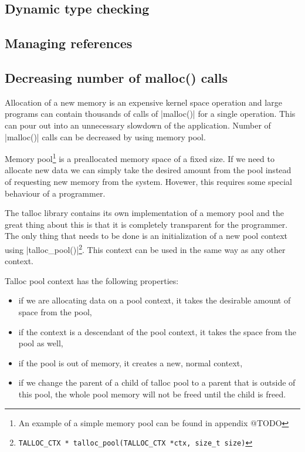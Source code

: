 \subsection{Dynamic type checking}
\label{talloc:subsec:type-checking}


\subsection{Managing references}
\label{talloc:subsec:references}

\subsection{Decreasing number of malloc() calls}
\label{talloc:subsec:pool}


Allocation of a new memory is an expensive kernel space operation and large
programs can contain thousands of calls of |malloc()| for a single operation.
This can pour out into an unnecessary slowdown of the application. Number of
|malloc()| calls can be decreased by using memory pool.

Memory pool\footnote{An example of a simple memory pool can be found in appendix
@TODO} is a preallocated memory space of a fixed size. If we need to allocate
new data we can simply take the desired amount from the pool instead of
requesting new memory from the system. Hovewer, this requires some special
behaviour of a programmer.

The talloc library contains its own implementation of a memory pool and the
great thing about this is that it is completely transparent for the programmer.
The only thing that needs to be done is an initialization of a new pool context
using |talloc_pool()|\footnote{\lstinline{TALLOC_CTX *
talloc_pool(TALLOC_CTX *ctx, size_t size)}}. This context can be used in the
same way as any other context.

Talloc pool context has the following properties:

\begin{itemize}
  \item if we are allocating data on a pool context, it takes the  desirable
  amount of space from the pool,
  \item if the context is a descendant of the pool context, it takes the space
  from the pool as well,
  \item if the pool is out of memory, it creates a new, normal context,
  \item if we change the parent of a child of talloc pool to a parent that is
  outside of this pool, the whole pool memory will not be freed until the child
  is freed.
\end{itemize}

